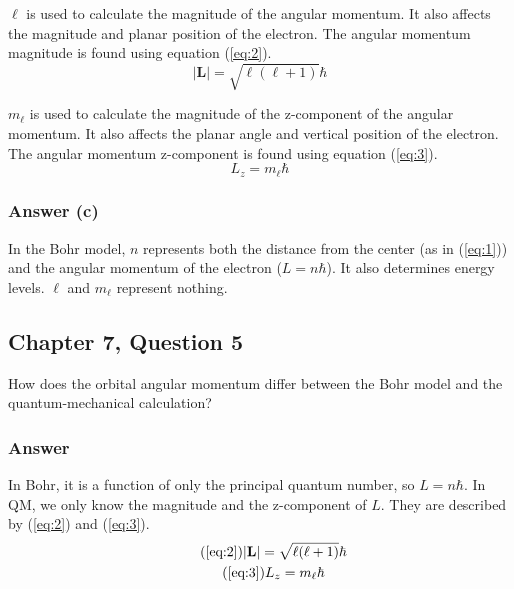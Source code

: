\documentclass[12pt]{article}
\begin{document}
                $\ell$ is used to calculate the magnitude of the angular momentum.
                It also affects the magnitude and planar position of the electron.
                The angular momentum magnitude is found using equation (\ref{eq:2}).
                \begin{equation}
                    \label{eq:2}
                    |\textbf{L}| = \sqrt{\ell(\ell + 1)}\hbar
                \end{equation}

                $m_\ell$ is used to calculate the magnitude of the z-component of the angular momentum.
                It also affects the planar angle and vertical position of the electron.
                The angular momentum z-component is found using equation (\ref{eq:3}).
                \begin{equation}
                    \label{eq:3}
                    L_z = m_\ell \hbar
                \end{equation}

            \subsubsection{Answer (c)}
                In the Bohr model, $n$ represents both the distance from the center (as in (\ref{eq:1})) and the angular momentum of the electron ($L = n\hbar$).
                It also determines energy levels.
                $\ell$ and $m_\ell$ represent nothing.
            
        \subsection{Chapter 7, Question 5}
            How does the orbital angular momentum differ between the Bohr model and the quantum-mechanical calculation?

            \subsubsection{Answer}
                In Bohr, it is a function of only the principal quantum number, so $L = n\hbar$.
                In QM, we only know the magnitude and the z-component of $L$.
                They are described by (\ref{eq:2}) and (\ref{eq:3}).
                \begin{gather}
                    \tag{\ref{eq:2}}
                    |\textbf{L}| = \sqrt{\ell(\ell + 1)}\hbar\\
                    \tag{\ref{eq:3}}
                    L_z = m_\ell \hbar
                \end{gather}
            
\end{document}
